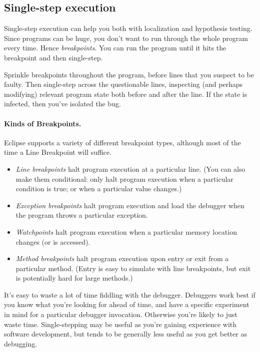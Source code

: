 \subsection*{Single-step execution}
Single-step execution can help you both with localization and
hypothesis testing.  Since programs can be huge, you don't want to run
through the whole program every time. Hence \emph{breakpoints}. You
can run the program until it hits the breakpoint and then
single-step. 

Sprinkle breakpoints throughout the program, before lines that you
suspect to be faulty. Then single-step across the questionable lines, inspecting
(and perhaps modifying) relevant program state both before and after
the line. If the state is infected, then you've isolated the bug.

\paragraph{Kinds of Breakpoints.} Eclipse supports a variety of different breakpoint
types\cite{eclipse:bp}, 
although most of the time a Line Breakpoint will suffice.

\begin{itemize}
\item \emph{Line breakpoints} halt program execution at a particular line. (You can also 
make them conditional: only halt program execution when a particular condition is true;
or when a particular value changes.)
\item \emph{Exception breakpoints} halt program execution and load the debugger when
the program throws a particular exception.
\item \emph{Watchpoints} halt program execution when a particular memory location changes
(or is accessed).
\item \emph{Method breakpoints} halt program execution upon entry or exit from a particular
method. (Entry is easy to simulate with line breakpoints, but exit is potentially hard for
large methods.)
\end{itemize}

It's easy to waste a lot of time fiddling with the debugger. Debuggers
work best if you know what you're looking for ahead of time, and 
have a specific experiment in mind for a particular debugger invocation.
Otherwise you're likely to just waste time. Single-stepping may be useful
as you're gaining experience with software development, but tends to be
generally less useful as you get better as debugging.




